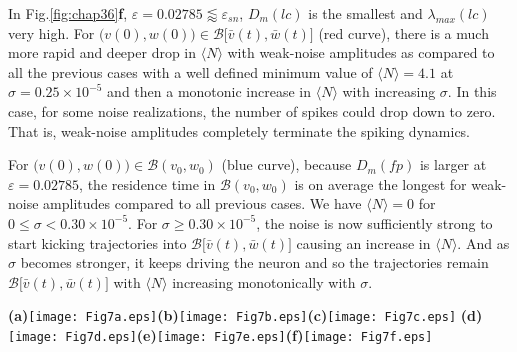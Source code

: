 In Fig.\ref{fig:chap36}\textbf{f},
$\varepsilon=0.02785\lessapprox\varepsilon_{sn}$, $D_{m}(lc)$ is
the smallest and $\lambda_{max}(lc)$ very high.
For $\big(v(0),w(0)\big)\in\mathcal{B}\big[\bar{v}(t),\bar{w}(t)\big]$
(red curve), there is a much more rapid and deeper drop in $\langle N\rangle$ with weak-noise
amplitudes as compared to all the previous cases with a well
defined minimum value of $\langle N\rangle=4.1$ at $\sigma=0.25\times10^{-5}$
and then a monotonic increase in $\langle N\rangle$ with increasing $\sigma$.
In this case, for some noise
realizations, the number of spikes could drop down to zero. That is, weak-noise amplitudes completely
terminate the spiking dynamics.

For $\big(v(0),w(0)\big)\in\mathcal{B}(v_0,w_0)$ (blue curve),
because $D_{m}(fp)$ is larger at $\varepsilon=0.02785$, the
residence time in $\mathcal{B}(v_0,w_0)$  is on average the
longest for weak-noise amplitudes compared to all previous cases. We have $\langle N\rangle=0$ for
$0\leq\sigma<0.30\times10^{-5}$. For $\sigma\geq0.30\times10^{-5}$, the noise is now
sufficiently strong to start kicking trajectories into $\mathcal{B}\big[\bar{v}(t),\bar{w}(t)\big]$
causing an increase in
$\langle N\rangle$. And as $\sigma$ becomes stronger, it keeps driving the neuron and so the
trajectories remain $\mathcal{B}\big[\bar{v}(t),\bar{w}(t)\big]$
with $\langle N\rangle$ increasing monotonically with $\sigma$.
\begin{figure*}%
\begin{center}
\textbf{(a)}\texttt{[image: Fig7a.eps]}\textbf{(b)}\texttt{[image: Fig7b.eps]}\textbf{(c)}\texttt{[image: Fig7c.eps]}
\textbf{(d)}\texttt{[image: Fig7d.eps]}\textbf{(e)}\texttt{[image: Fig7e.eps]}\textbf{(f)}\texttt{[image: Fig7f.eps]}
\caption{(Color online) Mean number of spikes $\langle N\rangle$ versus noise
amplitude $\sigma$ ($200$ trials for $7500$ units of time interval each), for 
different singular parameter values $\varepsilon$ as indicated. ISR always occurs when
$\big(v(0),w(0)\big)\in \mathcal{B}\big[\bar{v}(t),\bar{w}(t)\big]$ (red curves).
For $\big(v(0),w(0)\big)\in \mathcal{B}(v_0,w_0)$ (blue curves), ISR \textit{only} occurs
when $D_m(fp)<D_m(lc)$, i.e, when $\varepsilon\in(0.025,0.0260)$.
$a=-0.05, b=1.0, c=2.0$. See text for details} \label{fig:chap36}
\end{center}
\end{figure*}
